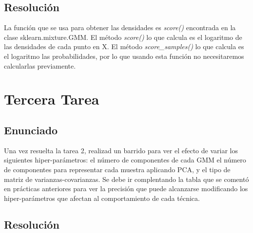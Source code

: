 \documentclass[12pt,twoside]{article}
\begin{document}
\subsection{Resolución}
La función que se usa para obtener las densidades es \textit{score()} encontrada en la clase sklearn.mixture.GMM. El método \textit{score()} lo que calcula es el logaritmo de las densidades de cada punto en X. El método \textit{score\_samples()} lo que calcula es el logaritmo las probabilidades, por lo que usando esta función no necesitaremos calcularlas previamente.

\section{Tercera Tarea}

\subsection{Enunciado}
\noindent
Una vez resuelta la tarea 2, realizad un barrido para ver el efecto de variar los siguientes hiper-parámetros:
el número de componentes de cada GMM
el número de componentes para representar cada muestra aplicando PCA, y
el tipo de matriz de varianzas-covarianzas.
Se debe ir complentando la tabla que se comentó en prácticas anteriores para ver la precisión que puede alcanzarse modificando los hiper-parámetros que afectan al comportamiento de cada técnica.

\subsection{Resolución}
\end{document}
